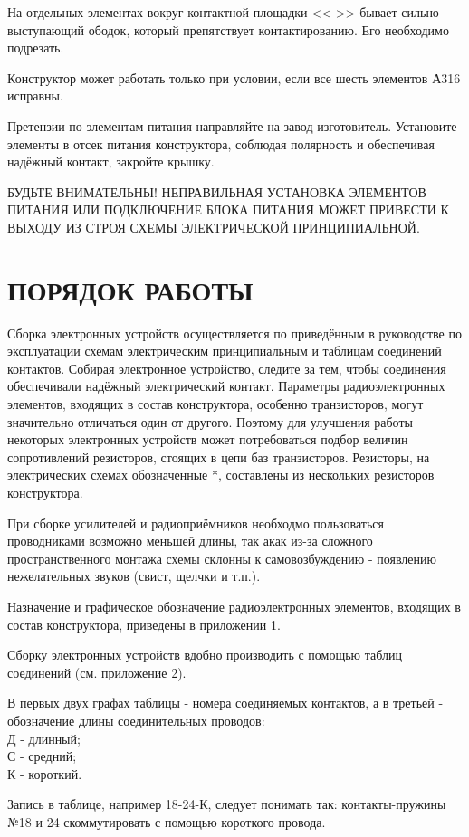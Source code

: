 \documentclass[12pt]{article}
\begin{document}
На отдельных элементах вокруг контактной площадки <<->> бывает сильно выступающий ободок, который препятствует контактированию. Его необходимо подрезать.

Конструктор может работать только при условии, если все шесть элементов А316 исправны.

Претензии по элементам питания направляйте на завод-изготовитель.
Установите элементы в отсек питания конструктора, соблюдая полярность и обеспечивая надёжный контакт, закройте крышку.

БУДЬТЕ ВНИМАТЕЛЬНЫ! НЕПРАВИЛЬНАЯ УСТАНОВКА ЭЛЕМЕНТОВ ПИТАНИЯ ИЛИ ПОДКЛЮЧЕНИЕ БЛОКА ПИТАНИЯ МОЖЕТ ПРИВЕСТИ К ВЫХОДУ ИЗ СТРОЯ СХЕМЫ ЭЛЕКТРИЧЕСКОЙ ПРИНЦИПИАЛЬНОЙ.
\newpage
\section{ПОРЯДОК РАБОТЫ}
Сборка электронных устройств осуществляется по приведённым в руководстве по эксплуатации схемам электрическим принципиальным и таблицам соединений контактов. Собирая электронное устройство, следите за тем, чтобы соединения обеспечивали надёжный электрический контакт. Параметры радиоэлектронных элементов, входящих в состав конструктора, особенно транзисторов, могут значительно отличаться один от другого. Поэтому для улучшения работы некоторых электронных устройств может потребоваться подбор величин сопротивлений резисторов, стоящих в цепи баз транзисторов. Резисторы, на электрических схемах обозначенные *, составлены из нескольких резисторов конструктора.

При сборке усилителей и радиоприёмников необходмо пользоваться проводниками возможно меньшей длины, так акак из-за сложного пространственного монтажа схемы склонны к самовозбуждению - появлению нежелательных звуков (свист, щелчки и т.п.).

Назначение и графическое обозначение радиоэлектронных элементов, входящих в состав конструктора, приведены в приложении 1.

Сборку электронных устройств вдобно производить с помощью таблиц соединений (см. приложение 2).

В первых двух графах таблицы - номера соединяемых контактов, а в третьей - обозначение длины соединительных проводов:\\
Д - длинный;\\
С - средний;\\
К - короткий.

Запись в таблице, например 18-24-К, следует понимать так: контакты-пружины №18 и 24 скоммутировать с помощью короткого провода.
\end{document}
